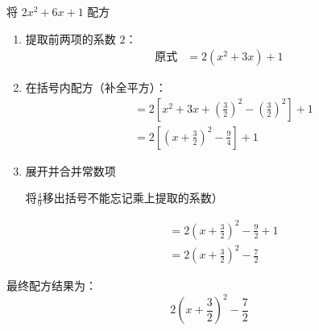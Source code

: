 \documentclass[lang=cn, 10pt, titlestyle=display, oneside]{elegantbook}
\begin{document}
\par
\begin{example}
    将 \(2x^2 + 6x+1\) 配方
\end{example}
\begin{solution}
\begin{enumerate}
    \item 提取前两项的系数 \(2\)：
    \begin{align*}
    \text{原式} &= 2\left(x^2 + 3x\right) + 1
    \end{align*}

    \item 在括号内配方（补全平方）：
    \begin{align*}
    &= 2\left[x^2 + 3x + \left(\frac{3}{2}\right)^2 - \left(\frac{3}{2}\right)^2\right] + 1\\
    &=2\left[\left(x + \frac{3}{2}\right)^2 - \frac{9}{4}\right] + 1
    \end{align*}

    \item 展开并合并常数项
    \begin{remark}
    将\(\frac{4}{9}\)移出括号不能忘记乘上提取的系数）
    \end{remark}
    \begin{align*}
    &=2\left(x + \frac{3}{2}\right)^2 - \frac{9}{2} + 1 \\
    &= 2\left(x + \frac{3}{2}\right)^2 - \frac{7}{2}
    \end{align*}
\end{enumerate}

最终配方结果为：
\[
2\left(x + \frac{3}{2}\right)^2 - \frac{7}{2}
\]

\end{solution}
\end{document}
